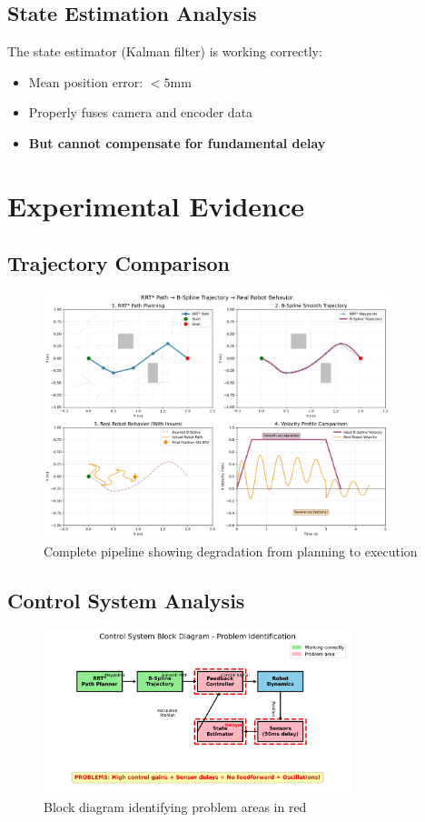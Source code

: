 \documentclass[12pt,a4paper]{article}
\begin{document}
\subsection{State Estimation Analysis}

The state estimator (Kalman filter) is working correctly:
\begin{itemize}
    \item Mean position error: $<5$mm
    \item Properly fuses camera and encoder data
    \item \textbf{But cannot compensate for fundamental delay}
\end{itemize}

\section{Experimental Evidence}

\subsection{Trajectory Comparison}

\begin{figure}[H]
\centering
\includegraphics[width=0.9\textwidth]{rrt_bspline_real_comparison.png}
\caption{Complete pipeline showing degradation from planning to execution}
\end{figure}

\subsection{Control System Analysis}

\begin{figure}[H]
\centering
\includegraphics[width=0.8\textwidth]{control_system_block_diagram.png}
\caption{Block diagram identifying problem areas in red}
\end{figure}
\end{document}
